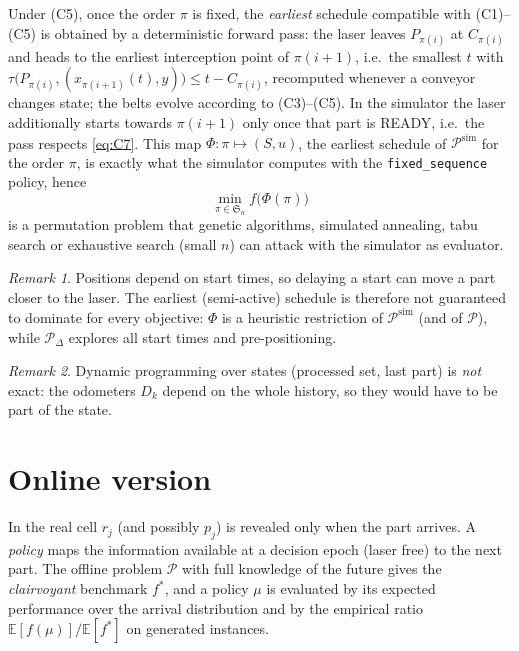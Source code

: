 \documentclass[11pt,a4paper]{article}
\theoremstyle{definition}
\theoremstyle{remark}
\newtheorem{remark}{Remark}
\newcommand{\Pb}{\mathcal{P}}
\begin{document}
Under (C5), once the order $\pi$ is fixed, the \emph{earliest} schedule compatible with
(C1)--(C5) is obtained by a deterministic forward pass: the laser leaves $P_{\pi(i)}$ at
$C_{\pi(i)}$ and heads to the earliest interception point of $\pi(i+1)$, i.e.\ the
smallest $t$ with $\tau\bigl(P_{\pi(i)},(x_{\pi(i+1)}(t),y)\bigr)\le t-C_{\pi(i)}$,
recomputed whenever a conveyor changes state; the belts evolve according to
(C3)--(C5). In the simulator the laser additionally starts towards $\pi(i+1)$ only
once that part is READY, i.e.\ the pass respects \eqref{eq:C7}. This map
$\Phi:\pi\mapsto(S,u)$, the earliest schedule of $\Pb^{\mathrm{sim}}$ for the order $\pi$,
is exactly what the simulator computes with the \texttt{fixed\_sequence} policy, hence
\[
\min_{\pi\in\mathfrak S_n} f\bigl(\Phi(\pi)\bigr)
\]
is a permutation problem that genetic algorithms, simulated annealing, tabu search or
exhaustive search (small $n$) can attack with the simulator as evaluator.

\begin{remark}
Positions depend on start times, so delaying a start can move a part closer to the
laser. The earliest (semi-active) schedule is therefore not guaranteed to dominate for
every objective: $\Phi$ is a heuristic restriction of $\Pb^{\mathrm{sim}}$ (and of
$\Pb$), while $\Pb_\Delta$ explores all start times and pre-positioning.
\end{remark}

\begin{remark}
Dynamic programming over states (processed set, last part) is \emph{not} exact: the
odometers $D_k$ depend on the whole history, so they would have to be part of the state.
\end{remark}

\section{Online version}

In the real cell $r_j$ (and possibly $p_j$) is revealed only when the part arrives. A
\emph{policy} maps the information available at a decision epoch (laser free) to the
next part. The offline problem $\Pb$ with full knowledge of the future gives the
\emph{clairvoyant} benchmark $f^\ast$, and a policy $\mu$ is evaluated by its expected
performance over the arrival distribution and by the empirical ratio
$\mathbb E[f(\mu)]/\mathbb E[f^\ast]$ on generated instances.
\end{document}
